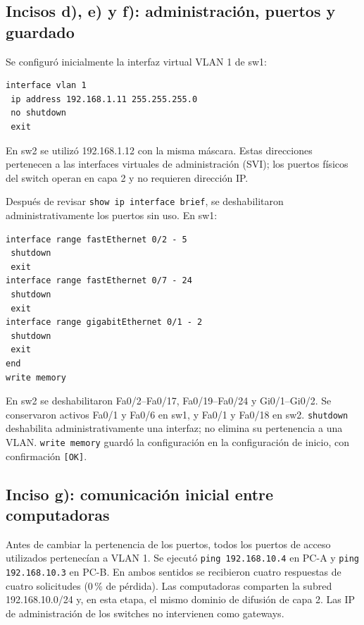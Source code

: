 \documentclass[12pt,a4paper]{article}
\begin{document}
\subsection{Incisos d), e) y f): administración, puertos y guardado}
Se configuró inicialmente la interfaz virtual VLAN 1 de sw1:
\begin{verbatim}
interface vlan 1
 ip address 192.168.1.11 255.255.255.0
 no shutdown
 exit
\end{verbatim}
En sw2 se utilizó 192.168.1.12 con la misma máscara. Estas direcciones
pertenecen a las interfaces virtuales de administración (SVI); los puertos
físicos del switch operan en capa 2 y no requieren dirección IP.

Después de revisar \texttt{show ip interface brief}, se deshabilitaron
administrativamente los puertos sin uso. En sw1:
\begin{verbatim}
interface range fastEthernet 0/2 - 5
 shutdown
 exit
interface range fastEthernet 0/7 - 24
 shutdown
 exit
interface range gigabitEthernet 0/1 - 2
 shutdown
 exit
end
write memory
\end{verbatim}
En sw2 se deshabilitaron Fa0/2--Fa0/17, Fa0/19--Fa0/24 y Gi0/1--Gi0/2.
Se conservaron activos Fa0/1 y Fa0/6 en sw1, y Fa0/1 y Fa0/18 en sw2.
\texttt{shutdown} deshabilita administrativamente una interfaz; no elimina
su pertenencia a una VLAN. \texttt{write memory} guardó la configuración
en la configuración de inicio, con confirmación \texttt{[OK]}.

\subsection{Inciso g): comunicación inicial entre computadoras}
Antes de cambiar la pertenencia de los puertos, todos los puertos de
acceso utilizados pertenecían a VLAN 1. Se ejecutó
\texttt{ping 192.168.10.4} en PC-A y \texttt{ping 192.168.10.3} en PC-B.
En ambos sentidos se recibieron cuatro respuestas de cuatro solicitudes
(0\,\% de pérdida). Las computadoras comparten la subred
192.168.10.0/24 y, en esta etapa, el mismo dominio de difusión de capa 2.
Las IP de administración de los switches no intervienen como gateways.
\end{document}
